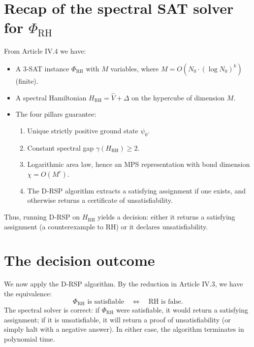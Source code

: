 \documentclass[11pt,a4paper]{article}
\begin{document}
\section{Recap of the spectral SAT solver for \(\Phi_{\text{RH}}\)}

From Article IV.4 we have:
\begin{itemize}
\item A 3‑SAT instance \(\Phi_{\text{RH}}\) with \(M\) variables, where \(M = O(N_0 \cdot (\log N_0)^k)\) (finite).
\item A spectral Hamiltonian \(H_{\text{RH}} = \hat{V} + \Delta\) on the hypercube of dimension \(M\).
\item The four pillars guarantee:
  \begin{enumerate}
  \item Unique strictly positive ground state \(\psi_0\).
  \item Constant spectral gap \(\gamma(H_{\text{RH}}) \ge 2\).
  \item Logarithmic area law, hence an MPS representation with bond dimension \(\chi = O(M^c)\).
  \item The D‑RSP algorithm extracts a satisfying assignment if one exists, and otherwise returns a certificate of unsatisfiability.
  \end{enumerate}
\end{itemize}
Thus, running D‑RSP on \(H_{\text{RH}}\) yields a decision: either it returns a satisfying assignment (a counterexample to RH) or it declares unsatisfiability.

\section{The decision outcome}

We now apply the D‑RSP algorithm. By the reduction in Article IV.3, we have the equivalence:
\[
\Phi_{\text{RH}} \text{ is satisfiable} \quad\Longleftrightarrow\quad \text{RH is false}.
\]
The spectral solver is correct: if \(\Phi_{\text{RH}}\) were satisfiable, it would return a satisfying assignment; if it is unsatisfiable, it will return a proof of unsatisfiability (or simply halt with a negative answer). In either case, the algorithm terminates in polynomial time.
\end{document}
